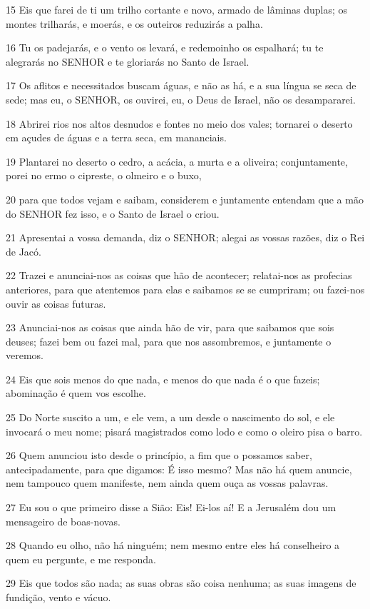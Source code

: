 \par 15 Eis que farei de ti um trilho cortante e novo, armado de lâminas duplas; os montes trilharás, e moerás, e os outeiros reduzirás a palha.
\par 16 Tu os padejarás, e o vento os levará, e redemoinho os espalhará; tu te alegrarás no SENHOR e te gloriarás no Santo de Israel.
\par 17 Os aflitos e necessitados buscam águas, e não as há, e a sua língua se seca de sede; mas eu, o SENHOR, os ouvirei, eu, o Deus de Israel, não os desampararei.
\par 18 Abrirei rios nos altos desnudos e fontes no meio dos vales; tornarei o deserto em açudes de águas e a terra seca, em mananciais.
\par 19 Plantarei no deserto o cedro, a acácia, a murta e a oliveira; conjuntamente, porei no ermo o cipreste, o olmeiro e o buxo,
\par 20 para que todos vejam e saibam, considerem e juntamente entendam que a mão do SENHOR fez isso, e o Santo de Israel o criou.
\par 21 Apresentai a vossa demanda, diz o SENHOR; alegai as vossas razões, diz o Rei de Jacó.
\par 22 Trazei e anunciai-nos as coisas que hão de acontecer; relatai-nos as profecias anteriores, para que atentemos para elas e saibamos se se cumpriram; ou fazei-nos ouvir as coisas futuras.
\par 23 Anunciai-nos as coisas que ainda hão de vir, para que saibamos que sois deuses; fazei bem ou fazei mal, para que nos assombremos, e juntamente o veremos.
\par 24 Eis que sois menos do que nada, e menos do que nada é o que fazeis; abominação é quem vos escolhe.
\par 25 Do Norte suscito a um, e ele vem, a um desde o nascimento do sol, e ele invocará o meu nome; pisará magistrados como lodo e como o oleiro pisa o barro.
\par 26 Quem anunciou isto desde o princípio, a fim que o possamos saber, antecipadamente, para que digamos: É isso mesmo? Mas não há quem anuncie, nem tampouco quem manifeste, nem ainda quem ouça as vossas palavras.
\par 27 Eu sou o que primeiro disse a Sião: Eis! Ei-los aí! E a Jerusalém dou um mensageiro de boas-novas.
\par 28 Quando eu olho, não há ninguém; nem mesmo entre eles há conselheiro a quem eu pergunte, e me responda.
\par 29 Eis que todos são nada; as suas obras são coisa nenhuma; as suas imagens de fundição, vento e vácuo.

